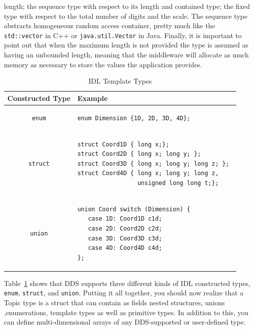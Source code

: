 length; the sequence type with respect to its length and  contained type; 
the fixed type with respect to the total number of digits and the scale. 
The sequence type abstracts homogeneous random access container, pretty 
much like the \texttt{std::vector} in C++ or \texttt{java.util.Vector} in Java. Finally, 
it is important to point out that when the maximum length is not provided 
the type is assumed as having an unbounded length, meaning that the
middleware will allocate as much memory as necessary to store the values 
the application provides.
\begin{table}
\begin{center}
{\small
\begin{tabular}{|c|l|}

\hline
	\textbf{Constructed Type} & \textbf{Example}  \\
\hline
\begin{lstlisting}
enum
\end{lstlisting}     &  %
\begin{lstlisting}
enum Dimension {1D, 2D, 3D, 4D}; 
\end{lstlisting} \\    
\hline 
\begin{lstlisting}
struct
\end{lstlisting}      & %
\begin{lstlisting}
struct Coord1D { long x;};
struct Coord2D { long x; long y; };
struct Coord3D { long x; long y; long z; }; 
struct Coord4D { long x; long y; long z,
                 unsigned long long t;};
\end{lstlisting} \\ 
\hline 
\begin{lstlisting}
union
\end{lstlisting}      & %
\begin{lstlisting}
union Coord switch (Dimension) {  
   case 1D: Coord1D c1d;
   case 2D: Coord2D c2d;
   case 3D: Coord3D c3d;
   case 4D: Coord4D c4d;
};
\end{lstlisting} \\

\hline 
\end{tabular}
}
\caption{IDL Template Types}
\label{Table:Contructed:Types} 
\end{center}
\end{table}
Table~\ref{Table:Contructed:Types} shows that \ac{DDS} supports three different 
kinds of \ac{IDL} constructed types, \texttt{enum}, \texttt{struct}, and \texttt{union}. 
Putting it all together, you should now realize that a Topic type is a struct that 
can contain as fields nested structures, unions ,enumerations, template types as 
well as primitive types. In addition to this, you can define  multi-dimensional 
arrays of any DDS-supported or user-defined type. 


